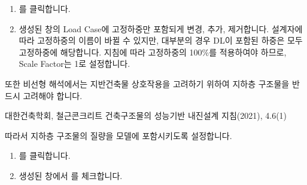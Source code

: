 \documentclass[a4paper,11pt,korean,openany,oneside]{sphinxmanual}
\begin{document}
\begin{sphinxShadowBox}
\begin{enumerate}
%
\item {} 
\sphinxAtStartPar
{} \sphinxhyphen{}  를 클릭합니다.

\item {} 
\sphinxAtStartPar
생성된 창의 Load Case에 고정하중만 포함되게 변경, 추가, 제거합니다.
설계자에 따라 고정하중의 이름이 바뀔 수 있지만, 대부분의 경우 DL이 포함된 하중은 모두 고정하중에 해당합니다.
지침에 따라 고정하중의 100\%를 적용하여야 하므로, Scale Factor는 1로 설정합니다.


\end{enumerate}
\end{sphinxShadowBox}

\sphinxAtStartPar
또한 비선형 해석에서는 지반\sphinxhyphen{}건축물 상호작용을 고려하기 위하여 지하층 구조물을 반드시 고려해야 합니다. %
\begin{footnote}[2]\sphinxAtStartFootnote
대한건축학회, 철근콘크리트 건축구조물의 성능기반 내진설계 지침(2021), 4.6\sphinxhyphen{}(1)
%
\end{footnote}
따라서 지하층 구조물의 질량을 모델에 포함시키도록 설정합니다.

\begin{sphinxShadowBox}
\begin{enumerate}
%
\item {} 
\sphinxAtStartPar
{} \sphinxhyphen{}  \sphinxhyphen{} 를 클릭합니다.

\item {} 
\sphinxAtStartPar
생성된 창에서 를 체크합니다.


\end{enumerate}
\end{sphinxShadowBox}
\end{document}
